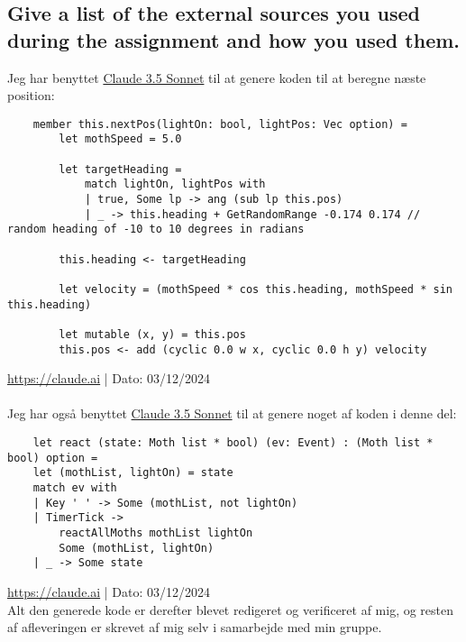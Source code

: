 \documentclass[a4paper,12pt]{article}
\begin{document}
\subsection{Give a list of the external sources you used during the assignment and how you used them.}
Jeg har benyttet \href{https://claude.ai}{Claude 3.5 Sonnet} til at genere koden til at beregne næste position:
\begin{lstlisting}
    member this.nextPos(lightOn: bool, lightPos: Vec option) = 
        let mothSpeed = 5.0

        let targetHeading =
            match lightOn, lightPos with
            | true, Some lp -> ang (sub lp this.pos)
            | _ -> this.heading + GetRandomRange -0.174 0.174 // random heading of -10 to 10 degrees in radians

        this.heading <- targetHeading

        let velocity = (mothSpeed * cos this.heading, mothSpeed * sin this.heading)

        let mutable (x, y) = this.pos
        this.pos <- add (cyclic 0.0 w x, cyclic 0.0 h y) velocity
\end{lstlisting}
\url{https://claude.ai} | Dato: 03/12/2024\\
\\
Jeg har også benyttet \href{https://claude.ai}{Claude 3.5 Sonnet} til at genere noget af koden i denne del:
\begin{lstlisting}
    let react (state: Moth list * bool) (ev: Event) : (Moth list * bool) option =
    let (mothList, lightOn) = state
    match ev with
    | Key ' ' -> Some (mothList, not lightOn)
    | TimerTick -> 
        reactAllMoths mothList lightOn
        Some (mothList, lightOn)
    | _ -> Some state
\end{lstlisting}
\url{https://claude.ai} | Dato: 03/12/2024\\
Alt den generede kode er derefter blevet redigeret og verificeret af mig, og resten af afleveringen er skrevet af mig selv i samarbejde med min gruppe.

\end{document}
